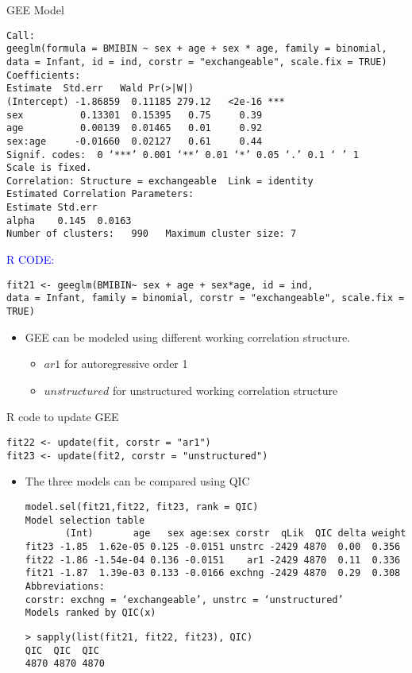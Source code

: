 \documentclass{beamer}
\begin{document}
\begin{frame}[fragile]
GEE Model
\scriptsize\begin{verbatim}
Call:
geeglm(formula = BMIBIN ~ sex + age + sex * age, family = binomial, 
data = Infant, id = ind, corstr = "exchangeable", scale.fix = TRUE)
Coefficients:
Estimate  Std.err   Wald Pr(>|W|)    
(Intercept) -1.86859  0.11185 279.12   <2e-16 ***
sex          0.13301  0.15395   0.75     0.39    
age          0.00139  0.01465   0.01     0.92    
sex:age     -0.01660  0.02127   0.61     0.44    
Signif. codes:  0 ‘***’ 0.001 ‘**’ 0.01 ‘*’ 0.05 ‘.’ 0.1 ‘ ’ 1
Scale is fixed.
Correlation: Structure = exchangeable  Link = identity 
Estimated Correlation Parameters:
Estimate Std.err
alpha    0.145  0.0163
Number of clusters:   990   Maximum cluster size: 7
\end{verbatim}
\textcolor{blue}{R CODE:} \begin{verbatim}
fit21 <- geeglm(BMIBIN~ sex + age + sex*age, id = ind, 
data = Infant, family = binomial, corstr = "exchangeable", scale.fix = TRUE)
\end{verbatim}
\end{frame}


\begin{frame}[fragile]
\begin{itemize}
	\item GEE can be modeled using different working correlation structure.
	\begin{itemize}
		\item $ar1$ for autoregressive order 1
		\item $unstructured$ for unstructured working correlation structure
	\end{itemize}
\end{itemize}
{\color{red} R code to update GEE}
\begin{verbatim}
fit22 <- update(fit, corstr = "ar1")
fit23 <- update(fit2, corstr = "unstructured")
\end{verbatim}
\end{frame}


\begin{frame} [fragile]
\begin{itemize}
\item The three models can be compared using QIC
\scriptsize
\begin{verbatim}
model.sel(fit21,fit22, fit23, rank = QIC)
Model selection table 
       (Int)       age   sex age:sex corstr  qLik  QIC delta weight
fit23 -1.85  1.62e-05 0.125 -0.0151 unstrc -2429 4870  0.00  0.356
fit22 -1.86 -1.54e-04 0.136 -0.0151    ar1 -2429 4870  0.11  0.336
fit21 -1.87  1.39e-03 0.133 -0.0166 exchng -2429 4870  0.29  0.308
Abbreviations:
corstr: exchng = ‘exchangeable’, unstrc = ‘unstructured’
Models ranked by QIC(x) 
\end{verbatim}
\begin{verbatim}
> sapply(list(fit21, fit22, fit23), QIC)
QIC  QIC  QIC 
4870 4870 4870 
\end{verbatim}
\end{itemize}
\end{frame}
\end{document}
